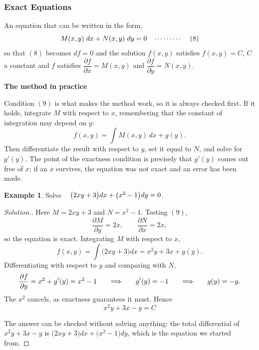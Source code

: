 \documentclass[11pt,a4paper]{article}
\theoremstyle{definition}
\newtheorem{exa}[thm]{Example}
\newenvironment{solution}
  {\renewcommand{\qedsymbol}{}\begin{proof}[\textit{Solution}.]}
  {\end{proof}}
\newcommand{\subhead}[1]{%
  \par\medskip\noindent\textbf{#1}\par\nobreak\smallskip}
\begin{document}
\subsubsection{Exact Equations}

An equation that can be written in the form, $$M(x,y)\hspace{0.1cm}dx + N(x,y)\hspace{0.1cm}dy = 0\hspace{0.3cm} \cdots\cdots\cdots\hspace{0.4cm} (8)$$
so that $(8)$ becomes $df = 0$ and the solution $f(x,y)$ satisfies
$f(x,y) = C$, $C$ a constant and $f$ satisfies
$\dfrac{\partial f}{\partial x} = M(x,y)$ and
$\dfrac{\partial f}{\partial y} = N(x,y)$.

\subhead{The method in practice}
Condition $(9)$ is what makes the method work, so it is always checked first. If
it holds, integrate $M$ with respect to $x$, remembering that the constant of
integration may depend on $y$:
$$f(x,y) = \int M(x,y)\,dx + g(y).$$
Then differentiate the result with respect to $y$, set it equal to $N$, and
solve for $g'(y)$. The point of the exactness condition is precisely that
$g'(y)$ comes out free of $x$; if an $x$ survives, the equation was not exact
and an error has been made.

\begin{exa}
Solve $\hspace{0.3cm}\big(2xy + 3\big)dx + \big(x^2 - 1\big)dy = 0$.
\end{exa}

\begin{solution}
Here $M = 2xy + 3$ and $N = x^2 - 1$. Testing $(9)$,
$$\frac{\partial M}{\partial y} = 2x,\qquad \frac{\partial N}{\partial x} = 2x,$$
so the equation is exact. Integrating $M$ with respect to $x$,
$$f(x,y) = \int \big(2xy + 3\big)dx = x^2y + 3x + g(y).$$
Differentiating with respect to $y$ and comparing with $N$,
$$\frac{\partial f}{\partial y} = x^2 + g'(y) = x^2 - 1
\hspace{0.5cm}\implies\hspace{0.5cm} g'(y) = -1
\hspace{0.5cm}\implies\hspace{0.5cm} g(y) = -y .$$
The $x^2$ cancels, as exactness guarantees it must. Hence
$$\boxed{x^2y + 3x - y = C}$$

The answer can be checked without solving anything: the total differential of
$x^2y + 3x - y$ is $\big(2xy+3\big)dx + \big(x^2-1\big)dy$, which is the
equation we started from.
\end{solution}
\end{document}
